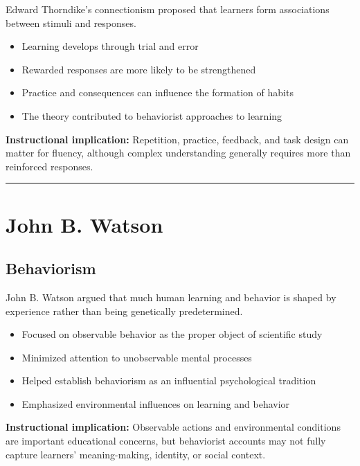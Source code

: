 \documentclass[
  letterpaper,
  DIV=11,
  numbers=noendperiod]{scrartcl}
\providecommand{\tightlist}{%
  \setlength{\itemsep}{0pt}\setlength{\parskip}{0pt}}\usepackage{longtable,booktabs,array}
\begin{document}
Edward Thorndike's connectionism proposed that learners form
associations between stimuli and responses.

\begin{itemize}
\tightlist
\item
  Learning develops through trial and error
\item
  Rewarded responses are more likely to be strengthened
\item
  Practice and consequences can influence the formation of habits
\item
  The theory contributed to behaviorist approaches to learning
\end{itemize}

\textbf{Instructional implication:} Repetition, practice, feedback, and
task design can matter for fluency, although complex understanding
generally requires more than reinforced responses.

\begin{center}\rule{0.5\linewidth}{0.5pt}\end{center}

\section{John B. Watson}\label{john-b.-watson}

\subsection{Behaviorism}\label{behaviorism}

John B. Watson argued that much human learning and behavior is shaped by
experience rather than being genetically predetermined.

\begin{itemize}
\tightlist
\item
  Focused on observable behavior as the proper object of scientific
  study
\item
  Minimized attention to unobservable mental processes
\item
  Helped establish behaviorism as an influential psychological tradition
\item
  Emphasized environmental influences on learning and behavior
\end{itemize}

\textbf{Instructional implication:} Observable actions and environmental
conditions are important educational concerns, but behaviorist accounts
may not fully capture learners' meaning-making, identity, or social
context.
\end{document}
